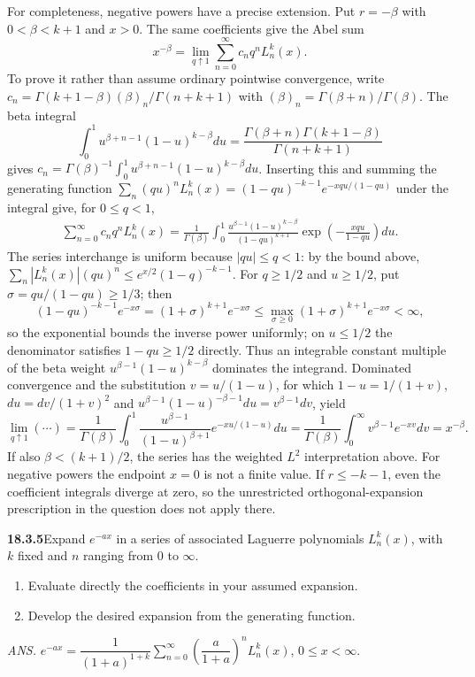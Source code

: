 For completeness, negative powers have a precise extension.
Put $r=-\beta$ with $0<\beta<k+1$ and $x>0$.  The same coefficients
give the Abel sum
\[
x^{-\beta}=\lim_{q\uparrow1}\sum_{n=0}^\infty c_nq^nL_n^k(x).
\]
To prove it rather than assume ordinary pointwise convergence, write
$c_n=\Gamma(k+1-\beta)(\beta)_n/\Gamma(n+k+1)$ with
$(\beta)_n=\Gamma(\beta+n)/\Gamma(\beta)$.  The beta integral
\[
\int_0^1u^{\beta+n-1}(1-u)^{k-\beta}du
=\frac{\Gamma(\beta+n)\Gamma(k+1-\beta)}{\Gamma(n+k+1)}
\]
gives $c_n=\Gamma(\beta)^{-1}\int_0^1u^{\beta+n-1}(1-u)^{k-\beta}du$.
Inserting this and summing the generating function
$\sum_n(qu)^nL_n^k(x)=(1-qu)^{-k-1}e^{-xqu/(1-qu)}$ under the integral
give, for $0\le q<1$,
\begin{align*}
\sum_{n=0}^\infty c_nq^nL_n^k(x)
 =\frac1{\Gamma(\beta)}\int_0^1
 \frac{u^{\beta-1}(1-u)^{k-\beta}}{(1-qu)^{k+1}}
 \exp\!\left(-\frac{xqu}{1-qu}\right)du.
\end{align*}
The series interchange is uniform because $|qu|\le q<1$: by the bound
above, $\sum_n|L_n^k(x)|(qu)^n\le e^{x/2}(1-q)^{-k-1}$.
For $q\ge1/2$ and $u\ge1/2$, put $\sigma=qu/(1-qu)\ge1/3$; then
\[
(1-qu)^{-k-1}e^{-x\sigma}=(1+\sigma)^{k+1}e^{-x\sigma}
\le\max_{\sigma\ge0}(1+\sigma)^{k+1}e^{-x\sigma}<\infty,
\]
so the exponential bounds the inverse power uniformly; on $u\le1/2$ the
denominator satisfies $1-qu\ge1/2$ directly.  Thus an integrable
constant multiple of the beta weight $u^{\beta-1}(1-u)^{k-\beta}$
dominates the integrand.  Dominated convergence and the substitution
$v=u/(1-u)$, for which $1-u=1/(1+v)$, $du=dv/(1+v)^2$ and
$u^{\beta-1}(1-u)^{-\beta-1}du=v^{\beta-1}dv$, yield
\[
\lim_{q\uparrow1}(\cdots)
 =\frac1{\Gamma(\beta)}\int_0^1
 \frac{u^{\beta-1}}{(1-u)^{\beta+1}}e^{-xu/(1-u)}du
 =\frac1{\Gamma(\beta)}\int_0^\infty v^{\beta-1}e^{-xv}dv
 =x^{-\beta}.
\]
If also $\beta<(k+1)/2$, the series has the weighted $L^2$
interpretation above.  For negative powers the endpoint $x=0$ is
not a finite value.  If $r\le-k-1$, even the coefficient integrals
diverge at zero, so the unrestricted orthogonal-expansion prescription
in the question does not apply there.

\par\bigskip
\noindent\textbf{18.3.5}\quad Expand $e^{-ax}$ in a series of
associated Laguerre polynomials $L_{n}^{k}(x)$, with $k$ fixed and
$n$ ranging from $0$ to $\infty$.
\begin{enumerate}
\item[(a)] Evaluate directly the coefficients in your assumed
expansion.
\item[(b)] Develop the desired expansion from the generating
function.
\end{enumerate}
\par\nobreak\hfill\emph{ANS.}\enspace
$e^{-ax}=\dfrac{1}{(1+a)^{1+k}}\displaystyle\sum_{n=0}^{\infty}
\left(\dfrac{a}{1+a}\right)^{n}L_{n}^{k}(x)$,\qquad
$0\le x<\infty$.
\par\nobreak
\solution
{}

